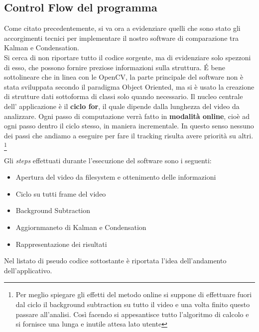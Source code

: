 \subsection{Control Flow del programma}\label{ControlFlow}
Come citato precedentemente, si va ora a evidenziare quelli che sono stato gli accorgimenti tecnici per implementare il nostro software di comparazione tra Kalman e Condensation.\\
Si cerca di non riportare tutto il codice sorgente, ma di evidenziare solo spezzoni di esso, che possono fornire preziose informazioni sulla struttura. \'E bene sottolineare che in linea con le OpenCV, la parte principale del software non è stata sviluppata secondo il paradigma Object Oriented, ma si è usato la creazione di strutture dati sottoforma di classi solo quando necessario.
Il nucleo centrale dell' applicazione è il \textbf{ciclo for}, il quale dipende dalla lunghezza del video da analizzare. Ogni passo di computazione verrà fatto in \textbf{modalità online}, cioè ad ogni passo dentro il ciclo stesso, in maniera incrementale. In questo senso nessuno dei passi che andiamo a eseguire per fare il tracking risulta avere priorità su altri. \footnote{Per meglio spiegare gli effetti del metodo online si suppone di effettuare fuori dal ciclo il background subtraction su tutto il video e una volta finito questo passare all'analisi. Così facendo si appesantisce tutto l'algoritmo di calcolo e si fornisce una lunga e inutile attesa lato utente} \\

\newpage

Gli \textit{steps} effettuati durante l'esecuzione del software sono i seguenti:
\begin{itemize}
\item Apertura del video da filesystem e ottenimento delle informazioni
\item Ciclo su tutti frame del video
\item Background Subtraction
\item Aggiornmaneto di Kalman e Condensation
\item Rappresentazione dei risultati 
\end{itemize}

Nel listato di pseudo codice sottostante è riportata l'idea dell'andamento dell'applicativo.


